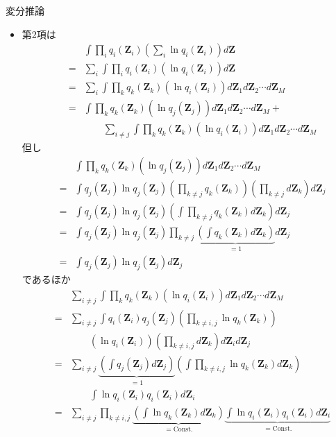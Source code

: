 \documentclass[dvipdfmx,notheorems,t]{beamer}
\begin{document}
\begin{frame}{変分推論}
\begin{itemize}
\begin{itemize}
		\item 第2項は
		\begin{eqnarray}
			&& \int \prod_i q_i(\bm{Z}_i) \left( \sum_i \ln q_i(\bm{Z}_i) \right) d\bm{Z} \nonumber \\
			&=& \sum_i \int \prod_i q_i(\bm{Z}_i) \left( \ln q_i(\bm{Z}_i) \right) d\bm{Z} \\
			&=& \sum_i \int \prod_k q_k(\bm{Z}_k) \left( \ln q_i(\bm{Z}_i) \right) d\bm{Z}_1 d\bm{Z}_2 \cdots d\bm{Z}_M \\
			&=& \int \prod_k q_k(\bm{Z}_k) \left( \ln q_j(\bm{Z}_j) \right) d\bm{Z}_1 d\bm{Z}_2 \cdots d\bm{Z}_M + \nonumber \\
			&& \qquad \sum_{i \neq j} \int \prod_k q_k(\bm{Z}_k) \left( \ln q_i(\bm{Z}_i) \right) d\bm{Z}_1 d\bm{Z}_2 \cdots d\bm{Z}_M
		\end{eqnarray}
		但し
		\begin{eqnarray}
			&& \int \prod_k q_k(\bm{Z}_k) \left( \ln q_j(\bm{Z}_j) \right) d\bm{Z}_1 d\bm{Z}_2 \cdots d\bm{Z}_M \\
			&=& \int q_j(\bm{Z}_j) \ln q_j(\bm{Z}_j) \left( \prod_{k \neq j} q_k(\bm{Z}_k) \right) \left( \prod_{k \neq j} d\bm{Z}_k \right) d\bm{Z}_j \\
			&=& \int q_j(\bm{Z}_j) \ln q_j(\bm{Z}_j) \left( \int \prod_{k \neq j} q_k(\bm{Z}_k) d\bm{Z}_k \right) d\bm{Z}_j \\
			&=& \int q_j(\bm{Z}_j) \ln q_j(\bm{Z}_j) \prod_{k \neq j} \underbrace{\left( \int q_k(\bm{Z}_k) d\bm{Z}_k \right)}_{=1} d\bm{Z}_j \\
			&=& \int q_j(\bm{Z}_j) \ln q_j(\bm{Z}_j) d\bm{Z}_j
		\end{eqnarray}
		であるほか
		\begin{eqnarray}
			&& \sum_{i \neq j} \int \prod_k q_k(\bm{Z}_k) \left( \ln q_i(\bm{Z}_i) \right) d\bm{Z}_1 d\bm{Z}_2 \cdots d\bm{Z}_M \nonumber \\
			&=& \sum_{i \neq j} \int q_i(\bm{Z}_i) q_j(\bm{Z}_j) \left( \prod_{k \neq i, j} \ln q_k(\bm{Z}_k) \right) \nonumber \\
			&& \qquad \left( \ln q_i(\bm{Z}_i) \right) \left( \prod_{k \neq i, j} d\bm{Z}_k \right) d\bm{Z}_i d\bm{Z}_j \\
			&=& \sum_{i \neq j} \underbrace{\left( \int q_j(\bm{Z}_j) d\bm{Z}_j \right)}_{=1} \left( \int \prod_{k \neq i, j} \ln q_k(\bm{Z}_k) d\bm{Z}_k \right) \nonumber \\
			&& \qquad \int \ln q_i(\bm{Z}_i) q_i(\bm{Z}_i) d\bm{Z}_i \\
			&=& \sum_{i \neq j} \prod_{k \neq i, j} \underbrace{\left( \int \ln q_k(\bm{Z}_k) d\bm{Z}_k \right)}_{=\mathrm{Const.}} \underbrace{\int \ln q_i(\bm{Z}_i) q_i(\bm{Z}_i) d\bm{Z}_i}_{=\mathrm{Const.}} \\

\end{eqnarray}
\end{itemize}
\end{itemize}
\end{frame}
\end{document}
